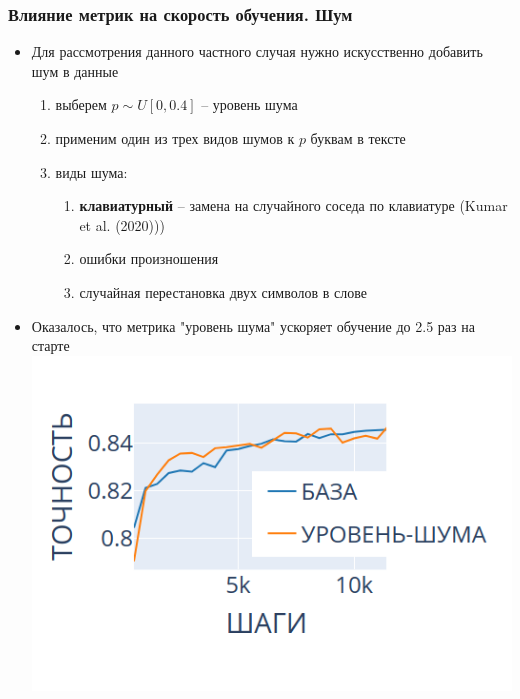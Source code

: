 \documentclass{beamer}
\begin{document}
\begin{frame}
	\frametitle{Влияние метрик на скорость обучения. Шум}
	\begin{itemize}
		\item Для рассмотрения данного частного случая нужно искусственно добавить шум в данные
			\begin{enumerate}
				\item выберем $p \sim U[0, 0.4]$ -- уровень шума
				\item применим один из трех видов шумов к $p$ буквам в тексте
				\item виды шума:
					\begin{enumerate}
						\item {\bf клавиатурный} -- замена на случайного соседа по клавиатуре (Kumar et al. (2020)))
						\item ошибки произношения
						\item случайная перестановка двух символов в слове
					\end{enumerate}
			\end{enumerate}
		\item Оказалось, что метрика "уровень шума" ускоряет обучение до 2.5 раз на старте
		\includegraphics[scale=0.48]{keyboard_noise_level_short_prefix}
	\end{itemize}
\end{frame}
\end{document}

